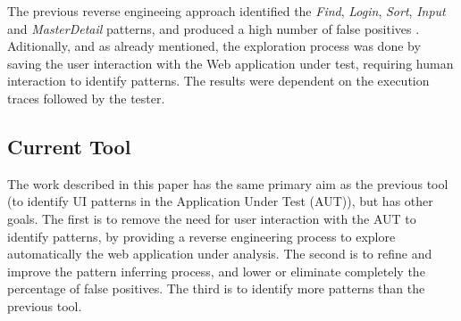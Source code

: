 \documentclass[conference]{IEEEtran}
\begin{document}
\begin{table}[!htb]
\caption{Example of an execution trace file.}
\label{tab:exec}
\end{table}

The previous reverse engineeing approach identified the \textit{Find}, \textit{Login}, \textit{Sort}, \textit{Input} and \textit{MasterDetail} patterns, and produced a high number of false positives \cite{nabuco2013inferring}. Aditionally, and as already mentioned, the exploration process was done by saving the user interaction with the Web application under test, requiring human interaction to identify patterns. The results were dependent on the execution traces followed by the tester. \\

\subsection{Current Tool}

The work described in this paper has the same primary aim as the previous tool (to identify UI patterns in the Application Under Test (AUT)), but has other goals. The first is to remove the need for user interaction with the AUT to identify patterns, by providing a reverse engineering process to explore automatically the web application under analysis. The second is to refine and improve the pattern inferring process, and lower or eliminate completely the percentage of false positives. The third is to identify more patterns than the previous tool.\\
\end{document}
